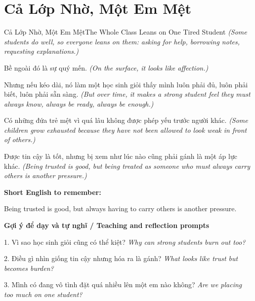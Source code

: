 \section{Cả Lớp Nhờ, Một Em Mệt}
\begin{truyen}{Cả Lớp Nhờ, Một Em Mệt}{The Whole Class Leans on One Tired Student}
\textit{(Some students do well, so everyone leans on them: asking for help, borrowing notes, requesting explanations.)}

Bề ngoài đó là sự quý mến.
\textit{(On the surface, it looks like affection.)}

Nhưng nếu kéo dài, nó làm một học sinh giỏi thấy mình luôn phải đủ, luôn phải biết, luôn phải sẵn sàng.
\textit{(But over time, it makes a strong student feel they must always know, always be ready, always be enough.)}

Có những đứa trẻ mệt vì quá lâu không được phép yếu trước người khác.
\textit{(Some children grow exhausted because they have not been allowed to look weak in front of others.)}

\end{truyen}

\begin{baihoc}
Được tin cậy là tốt, nhưng bị xem như lúc nào cũng phải gánh là một áp lực khác.
\textit{(Being trusted is good, but being treated as someone who must always carry others is another pressure.)}
\end{baihoc}

\begin{ghinhoanh}
\textbf{Short English to remember:}

Being trusted is good, but always having to carry others is another pressure.

\end{ghinhoanh}

\begin{tuhocnhanh}
\textbf{Gợi ý để dạy và tự nghĩ / Teaching and reflection prompts}

1. Vì sao học sinh giỏi cũng có thể kiệt? \textit{Why can strong students burn out too?}

2. Điều gì nhìn giống tin cậy nhưng hóa ra là gánh? \textit{What looks like trust but becomes burden?}

3. Mình có đang vô tình đặt quá nhiều lên một em nào không? \textit{Are we placing too much on one student?}
\end{tuhocnhanh}
\ngancach

